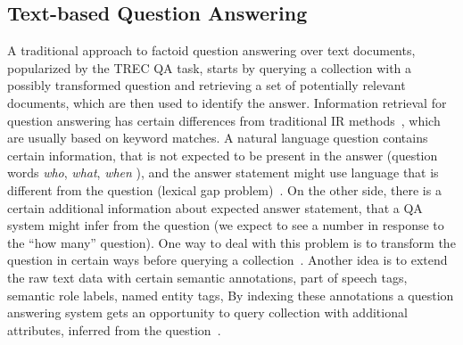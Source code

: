 \subsection{Text-based Question Answering}
\label{section:relatedwork:factoid:text}

A traditional approach to factoid question answering over text documents, popularized by the TREC QA task, starts by querying a collection with a possibly transformed question and retrieving a set of potentially relevant documents, which are then used to identify the answer.
Information retrieval for question answering has certain differences from traditional IR methods~\cite{keikha2014retrieving}, which are usually based on keyword matches.
A natural language question contains certain information, that is not expected to be present in the answer (\eg question words \textit{who}, \textit{what}, \textit{when} \etc), and the answer statement might use language that is different from the question (lexical gap problem)~\cite{berger2000bridging}.
On the other side, there is a certain additional information about expected answer statement, that a QA system might infer from the question (\eg we expect to see a number in response to the ``how many'' question).
One way to deal with this problem is to transform the question in certain ways before querying a collection~\cite{AgichteinLG01,brill_askmsr}.
Another idea is to extend the raw text data with certain semantic annotations, \eg part of speech tags, semantic role labels, named entity tags, \etc
By indexing these annotations a question answering system gets an opportunity to query collection with additional attributes, inferred from the question~\cite{bilotti2007structured,chen2016discriminative,yao2013automatic}.

